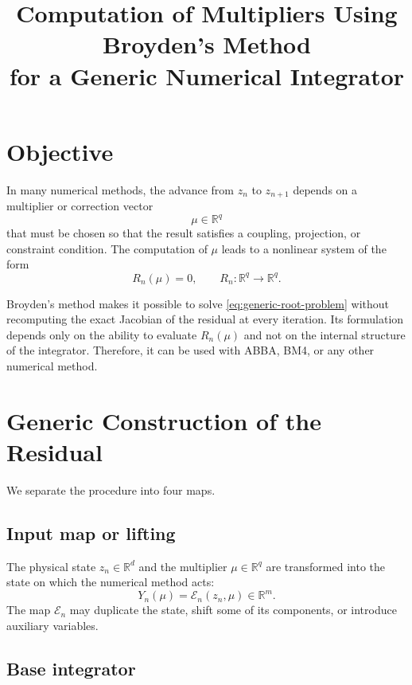 \documentclass[11pt,a4paper]{article}
\title{Computation of Multipliers Using Broyden's Method\\
for a Generic Numerical Integrator}
\author{}
\date{}
\newcommand{\R}{\mathbb{R}}
\begin{document}
\maketitle

\section{Objective}

In many numerical methods, the advance from $z_n$ to $z_{n+1}$ depends on a
multiplier or correction vector
\[
    \mu\in\R^q
\]
that must be chosen so that the result satisfies a coupling, projection, or
constraint condition. The computation of $\mu$ leads to a nonlinear system of
the form
\begin{equation}
    R_n(\mu)=0,
    \qquad
    R_n:\R^q\longrightarrow\R^q.
    \label{eq:generic-root-problem}
\end{equation}

Broyden's method makes it possible to solve \eqref{eq:generic-root-problem}
without recomputing the exact Jacobian of the residual at every iteration.
Its formulation depends only on the ability to evaluate $R_n(\mu)$ and not on
the internal structure of the integrator. Therefore, it can be used with
ABBA, BM4, or any other numerical method.

\section{Generic Construction of the Residual}

We separate the procedure into four maps.

\subsection{Input map or lifting}

The physical state $z_n\in\R^d$ and the multiplier $\mu\in\R^q$ are
transformed into the state on which the numerical method acts:
\begin{equation}
    Y_n(\mu)=\mathcal E_n(z_n,\mu)\in\R^m.
    \label{eq:lifting}
\end{equation}
The map $\mathcal E_n$ may duplicate the state, shift some of its components,
or introduce auxiliary variables.

\subsection{Base integrator}
\end{document}
